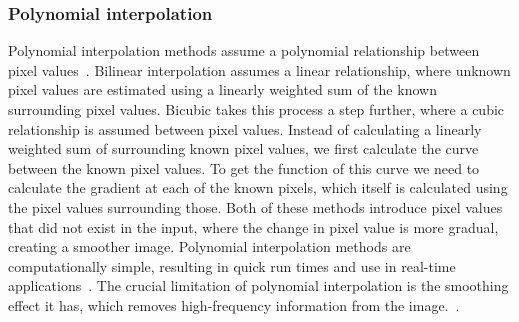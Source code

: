 \subsubsection{Polynomial interpolation}
Polynomial interpolation methods assume a polynomial relationship between pixel values~\cite{interpolation}. Bilinear interpolation assumes a linear relationship, where unknown pixel values are estimated using a linearly weighted sum of the known surrounding pixel values. Bicubic takes this process a step further, where a cubic relationship is assumed between pixel values. Instead of calculating a linearly weighted sum of surrounding known pixel values, we first calculate the curve between the known pixel values. To get the function of this curve we need to calculate the gradient at each of the known pixels, which itself is calculated using the pixel values surrounding those. Both of these methods introduce pixel values that did not exist in the input, where the change in pixel value is more gradual, creating a smoother image. Polynomial interpolation methods are computationally simple, resulting in quick run times and use in real-time applications~\cite{interpolation}. The crucial limitation of polynomial interpolation is the smoothing effect it has, which removes high-frequency information from the image.~\cite{interpolation}.

